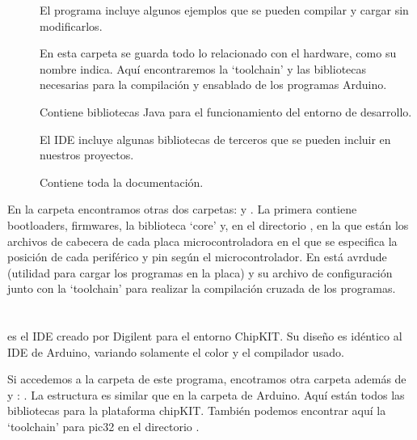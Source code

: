 \begin{description}
    \item[] El programa incluye algunos ejemplos que se pueden compilar y cargar sin modificarlos. 
    \item[] En esta carpeta se guarda todo lo relacionado con el hardware, como su nombre indica. Aquí encontraremos la `toolchain' y las bibliotecas necesarias para la compilación y ensablado de los programas Arduino.
    \item[] Contiene bibliotecas Java para el funcionamiento del entorno de desarrollo.
			\item[] El IDE incluye algunas bibliotecas de terceros que se pueden incluir en nuestros proyectos.
			\item[] Contiene toda la documentación.
\end{description}

En la carpeta  encontramos otras dos carpetas:  y .  La primera contiene bootloaders, firmwares, la biblioteca `core' y, en el directorio , en la que están los archivos de cabecera de cada placa microcontroladora en el que se especifica la posición de cada periférico y pin según el microcontrolador.  En  está avrdude (utilidad para cargar los programas en la placa) y su archivo de configuración junto con la `toolchain'  para realizar la compilación cruzada de los programas.

\section{}
\cite{website:mpide} es el IDE creado por Digilent para el entorno ChipKIT. Su diseño es idéntico al IDE de Arduino, variando solamente el color y el compilador usado.


Si accedemos a la carpeta  de este programa, encotramos otra carpeta además de  y : . La estructura es similar  que en la carpeta de Arduino. Aquí están todos las bibliotecas para la plataforma chipKIT. También podemos encontrar aquí la `toolchain'  para pic32 en el directorio .

